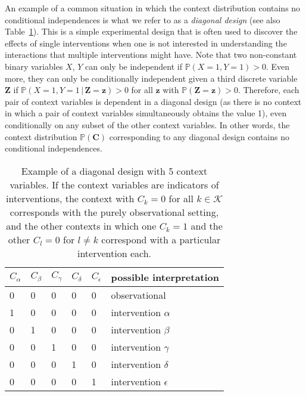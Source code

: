 \documentclass[twoside,11pt]{article}
\newcommand{\Prb}{\mathbb{P}}
\newcommand\B[1]{\bm{#1}}
\newcommand\C[1]{\mathcal{#1}}
\newcommand\given{\,|\,}
\begin{document}
An example of a common situation in which the context distribution contains no conditional independences is what we refer to as a \emph{diagonal design} (see also Table~\ref{tab:diagonal_design}). 
This is a simple experimental design that is often used to discover the effects of single interventions when one is not interested in understanding the interactions that multiple interventions might have. Note that two non-constant binary variables $X$, $Y$ can only be independent if $\Prb(X=1,Y=1) > 0$. Even more, they can only be conditionally independent given a third discrete variable $\B{Z}$ if $\Prb(X=1,Y=1 \given \B{Z}=\B{z}) > 0$ for all $\B{z}$ with $\Prb(\B{Z}=\B{z})>0$. Therefore, each pair of context variables is dependent in a diagonal design (as there is no context in which a pair of context variables simultaneously obtains the value 1), even conditionally on any subset of the other context variables. In other words, the context distribution $\Prb(\B{C})$ corresponding to any diagonal design contains no conditional independences.
\begin{table}
  \caption{Example of a diagonal design with 5 context variables. If the context variables are indicators of interventions, the context with $C_k = 0$ for all $k \in \C{K}$ corresponds with the purely observational setting, and the other contexts in which one $C_k = 1$ and the other $C_l = 0$ for $l \ne k$ correspond with a particular intervention each.\label{tab:diagonal_design}}
\centering\begin{tabular}{lllll|l}
  $C_\alpha$ & $C_\beta$ & $C_\gamma$ & $C_\delta$ & $C_\epsilon$ & possible interpretation \\
  \hline
  0 & 0 & 0 & 0 & 0 & observational \\
  1 & 0 & 0 & 0 & 0 & intervention $\alpha$ \\
  0 & 1 & 0 & 0 & 0 & intervention $\beta$ \\
  0 & 0 & 1 & 0 & 0 & intervention $\gamma$ \\
  0 & 0 & 0 & 1 & 0 & intervention $\delta$ \\
  0 & 0 & 0 & 0 & 1 & intervention $\epsilon$ \\
\end{tabular}
\end{table}
\end{document}
